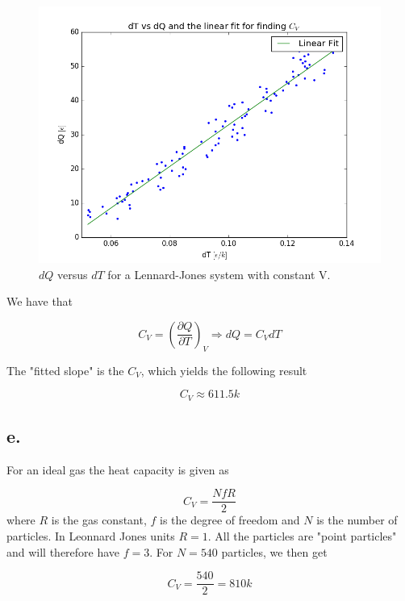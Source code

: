 \documentclass{article}
\newcommand{\pd}[2]{\frac{\partial #1}{\partial #2}}
\begin{document}
\begin{figure}[H]
\centering
\includegraphics[scale=0.5]{project_2/problem_d}
\caption{$dQ$ versus $dT$ for a Lennard-Jones system with constant V.}
\label{fig:isoTherm}
\end{figure}

We have that 

\begin{equation}
C_V = \left(\pd{Q}{T}\right)_V \Rightarrow dQ = C_VdT
\end{equation}

The "fitted slope" is the $C_V$, which yields the following result

\begin{equation}
C_V \approx 611.5  k
\end{equation}


\subsection*{e.}
For an ideal gas the heat capacity is given as

\begin{equation}
C_V = \frac{NfR}{2}
\end{equation}
where $R$ is the gas constant, $f$ is the degree of freedom and $N$ is the number of particles. In Leonnard Jones units $R = 1$. All the particles are "point particles" and will therefore have $f = 3$. For $N = 540$ particles, we then get

\begin{equation}
C_V = \frac{540}{2} = 810k
\end{equation}
\end{document}
